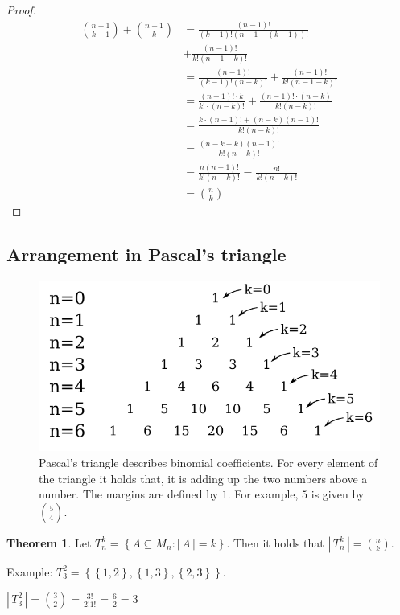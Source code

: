 \documentclass[a4paper,landscape,twocolumn]{article}
\theoremstyle{definition}
\newtheorem{theorem}{Theorem}
\newcommand\set[1]{\left\{#1\right\}}
\newcommand\card[1]{\left|\,#1\,\right|}
\begin{document}
\begin{proof}
  \begin{align*}
      \binom{n-1}{k-1} + \binom{n-1}{k}
          &= \frac{(n-1)!}{(k-1)! (n-1 - (k-1))!} \\
          &+ \frac{(n-1)!}{k! (n-1-k)!} \\
      &= \frac{(n-1)!}{(k-1)! (n-k)!} + \frac{(n-1)!}{k! (n-1-k)!} \\
      &= \frac{(n-1)! \cdot k}{k! \cdot (n-k)!} + \frac{(n-1)! \cdot (n-k)}{k! (n-k)!} \\
      &= \frac{k \cdot (n-1)! + (n-k)(n-1)!}{k! (n-k)!} \\
      &= \frac{(n-k+k)(n-1)!}{k! (n-k)!} \\
      &= \frac{n (n-1)!}{k!(n-k)!} = \frac{n!}{k! (n-k)!} \\
      &= \binom nk
  \end{align*}
\end{proof}

\subsection{Arrangement in Pascal's triangle}
\begin{figure}[!h]
  \begin{center}
    \includegraphics{img/pascals_triangle.pdf}
    \caption{
      Pascal's triangle describes binomial coefficients.
      For every element of the triangle it holds that,
      it is adding up the two numbers above a number.
      The margins are defined by $1$. For example, $5$ is given by ${5 \choose 4}$.
    }
  \end{center}
\end{figure}

\begin{theorem}
  Let $T_n^k = \set{A \subseteq M_n: \card{A} = k}$.
  Then it holds that $\card{T_n^k} = \binom nk$.

  Example: $T_3^2 = \set{\set{1, 2}, \set{1, 3}, \set{2, 3}}$.

  $\card{T_3^2} = \binom 32 = \frac{3!}{2! 1!} = \frac 62 = 3$
\end{theorem}
\end{document}

